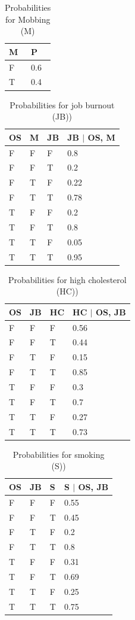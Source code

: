 \begin{table}
\centering
\caption{Probabilities for Mobbing (M)}\label{tab1}
\begin{tabular}{p{1.2cm} p{1.2cm} }
\hline
M &  P\\
\hline
F &	0.6\\
T &	0.4\\
\hline
\end{tabular}
\end{table}


\begin{table}
\centering
\caption{Probabilities for job burnout (JB))}\label{tab1}
\begin{tabular}{p{1.2cm} p{1.2cm} p{1.2cm} p{2cm} }
\hline
OS & M & JB & JB $\mid$ OS, M\\
\hline
F &	F &	F &	0.8\\
F &	F &	T &	0.2\\
F &	T &	F &	0.22\\
F &	T &	T &	0.78\\
T &	F &	F &	0.2\\
T &	F &	T &	0.8\\
T &	T &	F &	0.05\\
T &	T &	T &	0.95\\
\hline
\end{tabular}
\end{table}

\begin{table}
\centering
\caption{Probabilities for high cholesterol (HC))}\label{tab1}
\begin{tabular}{p{1.2cm} p{1.2cm} p{1.2cm} p{2cm} }
\hline
OS & JB & HC & HC $\mid$ OS, JB\\
\hline
F &	F &	F &	0.56\\
F &	F &	T &	0.44\\
F &	T &	F &	0.15\\
F &	T &	T &	0.85\\
T &	F &	F &	0.3\\
T &	F &	T &	0.7\\
T &	T &	F &	0.27\\
T &	T &	T &	0.73\\
\hline
\end{tabular}
\end{table}


\begin{table}
\centering
\caption{Probabilities for smoking (S))}\label{tab1}
\begin{tabular}{p{1.2cm} p{1.2cm} p{1.2cm} p{2.2cm} }
\hline
OS & JB & S & S $\mid$ OS, JB\\
\hline
F &	F &	F &	0.55\\
F &	F &	T &	0.45\\
F &	T &	F &	0.2\\
F &	T &  T &	0.8\\
T &	F &	F &	0.31\\
T &	F &	T &	0.69\\
T &	T &	F &	0.25\\
T &	T &	T &	0.75\\
\hline
\end{tabular}
\end{table}





